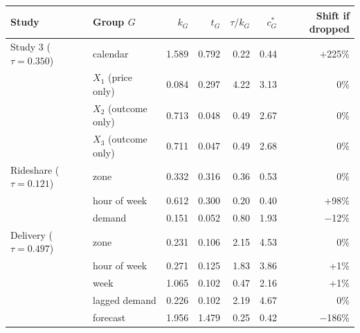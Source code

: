 \begin{tabular}{llrrrrr}
\toprule
Study & Group $G$ & $k_G$ & $t_G$ & $\tau / k_G$ & $c^\ast_G$ & Shift if dropped \\
\midrule
Study 3 ($\tau = 0.350$) & calendar & 1.589 & 0.792 & 0.22 & 0.44 & +225\% \\
 & $X_1$ (price only) & 0.084 & 0.297 & 4.22 & 3.13 & 0\% \\
 & $X_2$ (outcome only) & 0.713 & 0.048 & 0.49 & 2.67 & 0\% \\
 & $X_3$ (outcome only) & 0.711 & 0.047 & 0.49 & 2.68 & 0\% \\
\addlinespace
Rideshare ($\tau = 0.121$) & zone & 0.332 & 0.316 & 0.36 & 0.53 & 0\% \\
 & hour of week & 0.612 & 0.300 & 0.20 & 0.40 & +98\% \\
 & demand & 0.151 & 0.052 & 0.80 & 1.93 & $-$12\% \\
\addlinespace
Delivery ($\tau = 0.497$) & zone & 0.231 & 0.106 & 2.15 & 4.53 & 0\% \\
 & hour of week & 0.271 & 0.125 & 1.83 & 3.86 & +1\% \\
 & week & 1.065 & 0.102 & 0.47 & 2.16 & +1\% \\
 & lagged demand & 0.226 & 0.102 & 2.19 & 4.67 & 0\% \\
 & forecast & 1.956 & 1.479 & 0.25 & 0.42 & $-$186\% \\
\bottomrule
\end{tabular}
